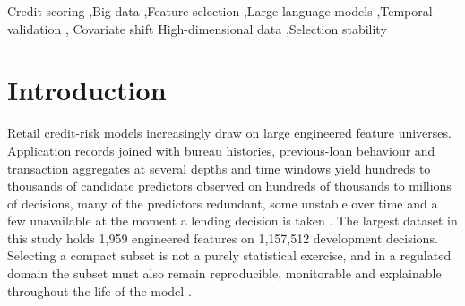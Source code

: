 \documentclass[final,5p,twocolumn]{elsarticle}
\providecommand{\DIFaddtex}[1]{{\protect\color{blue} \sf #1}} %
\providecommand{\DIFdeltex}[1]{{\protect\color{red} \scriptsize #1}} %
\providecommand{\DIFaddbegin}{} %
\providecommand{\DIFaddend}{} %
\providecommand{\DIFdelbegin}{} %
\providecommand{\DIFdelend}{} %
\providecommand{\DIFadd}[1]{\texorpdfstring{\DIFaddtex{#1}}{#1}} %
\providecommand{\DIFdel}[1]{\texorpdfstring{\DIFdeltex{#1}}{}} %
\begin{document}
\begin{frontmatter}
\begin{abstract}
favours the classical leader ($-0.010$ to $-0.027$). \DIFaddbegin \DIFadd{In a matched measurement on one Stability 2024 development fold, mRMR took 522 seconds over the full universe and 21 seconds over a 100-feature pool. }\DIFaddend Semantic pre-screening is a usable\DIFaddbegin \DIFadd{, dataset-dependent }\DIFaddend first-pass filter \DIFdelbegin \DIFdel{whose benefit depends on dataset and backbone; it should be governed with }\DIFdelend \DIFaddbegin \DIFadd{that needs }\DIFaddend stability and drift monitoring.
\end{abstract}

\begin{keyword}
Credit scoring \sep Big data \sep Feature selection \sep Large language models \sep Temporal validation \sep \DIFdelbegin \DIFdel{Covariate shift }\DIFdelend \DIFaddbegin \DIFadd{High-dimensional data }\DIFaddend \sep Selection stability
\end{keyword}

\end{frontmatter}


\section{Introduction}
\label{sec:introduction}

Retail credit-risk models increasingly draw on large engineered feature universes. Application records joined with bureau histories, previous-loan behaviour and transaction aggregates at several depths and time windows yield hundreds to thousands of candidate predictors observed on hundreds of thousands to millions of decisions, many of the predictors redundant, some unstable over time and a few unavailable at the moment a lending decision is taken \cite{thomas2002,siddiqi2006}. The largest dataset in this study holds 1,959 engineered features on 1,157,512 development decisions. Selecting a compact subset is not a purely statistical exercise, and in a regulated domain the subset must also remain reproducible, monitorable and explainable throughout the life of the model \cite{lessmann2015,gunnarsson2021,ballegeer2025}.
\end{document}
